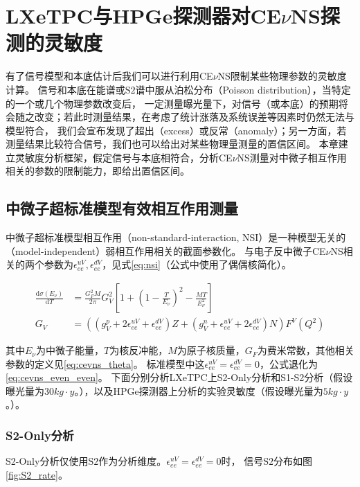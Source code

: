
\chapter{LXeTPC与HPGe探测器对CE$\nu$NS探测的灵敏度}
\label{sec:sensitivity}

有了信号模型和本底估计后我们可以进行利用CE$\nu$NS限制某些物理参数的灵敏度计算。
信号和本底在能谱或$\mathrm{S2}$谱中服从泊松分布（Poisson distribution），当特定的一个或几个物理参数改变后，
一定测量曝光量下，对信号（或本底）的预期将会随之改变；若此时测量结果，在考虑了统计涨落及系统误差等因素时仍然无法与模型符合，
我们会宣布发现了超出（excess）或反常（anomaly）；另一方面，若测量结果比较符合信号，我们也可以给出对某些物理量测量的置信区间。
本章建立灵敏度分析框架，假定信号与本底相符合，分析CE$\nu$NS测量对中微子相互作用相关的参数的限制能力，即给出置信区间。

\section{中微子超标准模型有效相互作用测量}

中微子超标准模型相互作用（non-standard-interaction, NSI）是一种模型无关的（model-independent）弱相互作用相关的截面参数化\cite{barranco_probing_2005}。
与电子反中微子CE$\nu$NS相关的两个参数为$\epsilon_{ee}^{uV},\epsilon_{ee}^{dV}$，见式\ref{eq:nsi}（公式中使用了偶偶核简化）。

\begin{align}
    \label{eq:nsi}
    \frac{\mathrm{d}\sigma(E_\nu)}{\mathrm{d}T} &= \frac{G_F^2 M}{2\pi}G_V^2\left[1+(1-\frac{T}{E_{\nu}})^2-\frac{MT}{E_{\nu}^2}\right] \\
    G_V &= ((g_V^p+2\epsilon_{ee}^{uV}+\epsilon_{ee}^{dV})Z+(g_V^n+\epsilon_{ee}^{uV}+2\epsilon_{ee}^{dV})N)F^V(Q^2)
\end{align}

其中$E_\nu$为中微子能量，$T$为核反冲能，$M$为原子核质量，$G_F$为费米常数，其他相关参数的定义见\ref{eq:cevns_theta}。
标准模型中这$\epsilon_{ee}^{uV}=\epsilon_{ee}^{dV}=0$，公式退化为\ref{eq:cevns_even_even}。
下面分别分析LXeTPC上S2-Only分析和S1-S2分析（假设曝光量为$30\si{kg\cdot y}$。），以及HPGe探测器上分析的实验灵敏度（假设曝光量为$5\si{kg\cdot y}$。）。

\subsection{S2-Only分析}

S2-Only分析仅使用$\mathrm{S2}$作为分析维度。$\epsilon_{ee}^{uV}=\epsilon_{ee}^{dV}=0$时，
信号$\mathrm{S2}$分布如图\ref{fig:S2_rate}。

